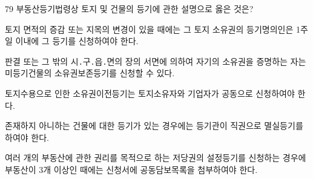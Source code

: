 \begin{question}{79}
부동산등기법령상 토지 및 건물의 등기에 관한 설명으로 옳은 것은?
\begin{choices}
  \item 토지 면적의 증감 또는 지목의 변경이 있을 때에는 그 토지 소유권의 등기명의인은 1주일 이내에 그 등기를 신청하여야 한다.
  \item 판결 또는 그 밖의 시․구․읍․면의 장의 서면에 의하여 자기의 소유권을 증명하는 자는 미등기건물의 소유권보존등기를 신청할 수 있다.
  \item 토지수용으로 인한 소유권이전등기는 토지소유자와 기업자가 공동으로 신청하여야 한다.
  \item 존재하지 아니하는 건물에 대한 등기가 있는 경우에는 등기관이 직권으로 멸실등기를 하여야 한다.
  \item 여러 개의 부동산에 관한 권리를 목적으로 하는 저당권의 설정등기를 신청하는 경우에 부동산이 3개 이상인 때에는 신청서에 공동담보목록을 첨부하여야 한다.
\end{choices}
\end{question}
